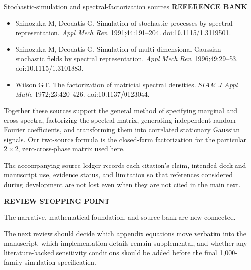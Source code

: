 \documentclass[aspectratio=169,11pt]{beamer}
\newcommand{\sectionlabel}[1]{%
  {\color{Accent}\fontsize{8}{9.5}\selectfont\bfseries\MakeUppercase{#1}}\par\vspace{0.12cm}}
\begin{document}
\begin{frame}{Stochastic-simulation and spectral-factorization sources}
\sectionlabel{Reference Bank}
\fontsize{9.0}{11.3}\selectfont
\begin{itemize}
  \item Shinozuka M, Deodatis G. Simulation of stochastic processes by spectral representation. \emph{Appl Mech Rev}. 1991;44:191--204. doi:10.1115/1.3119501.
  \item Shinozuka M, Deodatis G. Simulation of multi-dimensional Gaussian stochastic fields by spectral representation. \emph{Appl Mech Rev}. 1996;49:29--53. doi:10.1115/1.3101883.
  \item Wilson GT. The factorization of matricial spectral densities. \emph{SIAM J Appl Math}. 1972;23:420--426. doi:10.1137/0123044.
\end{itemize}

\vspace{0.22cm}
Together these sources support the general method of specifying marginal and
cross-spectra, factorizing the spectral matrix, generating independent random
Fourier coefficients, and transforming them into correlated stationary
Gaussian signals. Our two-source formula is the closed-form factorization for
the particular $2\times2$, zero-cross-phase matrix used here.

\vspace{0.20cm}
The accompanying source ledger records each citation's claim, intended deck and
manuscript use, evidence status, and limitation so that references considered
during development are not lost even when they are not cited in the main text.
\end{frame}

\begin{frame}[plain]
  \vspace{1.0cm}
  {\color{Accent}\fontsize{10}{12}\selectfont\bfseries REVIEW STOPPING POINT}\par\vspace{0.45cm}
  {\color{Ink}\fontsize{25}{29}\selectfont The narrative, mathematical foundation, and source bank are now connected.}\par\vspace{0.55cm}
  {\color{Body}\fontsize{14}{19}\selectfont
  The next review should decide which appendix equations move verbatim into the
  manuscript, which implementation details remain supplemental, and whether any
  literature-backed sensitivity conditions should be added before the final
  1,000-family simulation specification.}
\end{frame}
\end{document}
